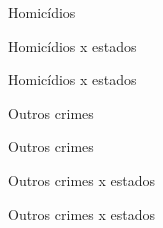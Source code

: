 \documentclass{beamer}
\begin{document}
\begin{frame}{Homicídios}
	
\end{frame}

\begin{frame}{Homicídios x estados}
	
\end{frame}

\begin{frame}{Homicídios x estados}
	
\end{frame}

\begin{frame}{Outros crimes}
	
\end{frame}

\begin{frame}{Outros crimes}
	
\end{frame}

\begin{frame}{Outros crimes x estados}
	
\end{frame}

\begin{frame}{Outros crimes x estados}
	
\end{frame}
\end{document}
